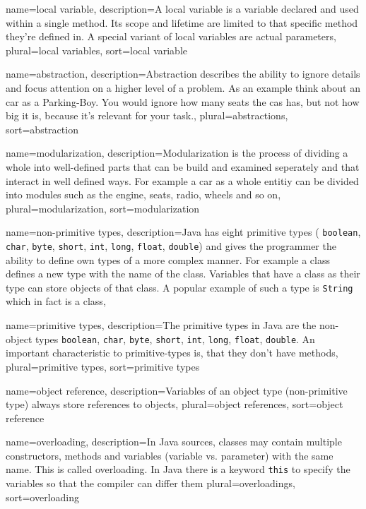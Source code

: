 {
	name=local variable,
	description={A local variable is a variable declared and used within a
		single method. Its scope and lifetime are limited to that
		specific method they're defined in. A special variant of local
		variables are actual parameters},
	plural=local variables,
	sort=local variable
}

{
	name=abstraction,
	description={Abstraction describes the ability to ignore details and
		focus attention on a higher level of a problem. As an example
		think about an car as a Parking-Boy. You would ignore how
		many seats the cas has, but not how big it is, because it's
		relevant for your task.},
	plural=abstractions,
	sort=abstraction
}

{
	name=modularization,
	description={Modularization is the process of dividing a whole into
		well-defined parts that can be build and examined seperately
		and that interact in well defined ways. For example a car as
		a whole entitiy can be divided into modules such as the
		engine, seats, radio, wheels and so on},
	plural=modularization,
	sort=modularization
}

{
	name=non-primitive types,
	description={Java has eight primitive types (
		\lstinline?boolean?, \lstinline?char?,
		\lstinline?byte?, \lstinline?short?, \lstinline?int?, 
		\lstinline?long?, \lstinline?float?, \lstinline?double?) and
		gives the programmer the ability to define own types of a
		more complex manner. For example a class defines a new type 
		with the name of the class. Variables that have a class as
		their type can store objects of that class. A popular 
		example of such a type is \lstinline?String? which in fact
		is a class},
}

{
	name=primitive types,
	description={The primitive types in Java are the non-object types
		\lstinline?boolean?, \lstinline?char?,
		\lstinline?byte?, \lstinline?short?, \lstinline?int?, 
		\lstinline?long?, \lstinline?float?, \lstinline?double?.
		An important characteristic to primitive-types is, that they
		don't have methods},
	plural=primitive types,
	sort=primitive types
}

{
	name=object reference,
	description={Variables of an object type (non-primitive type) always
		store references to objects},
	plural=object references,
	sort=object reference
}

{
	name=overloading,
	description={In Java sources, classes may contain multiple constructors,
		methods and variables (variable vs. parameter) with the same 
		name. This is called overloading. In Java there is a keyword 
		\lstinline?this? to
		specify the variables so that the compiler can differ them}
	plural=overloadings,
	sort=overloading
}
